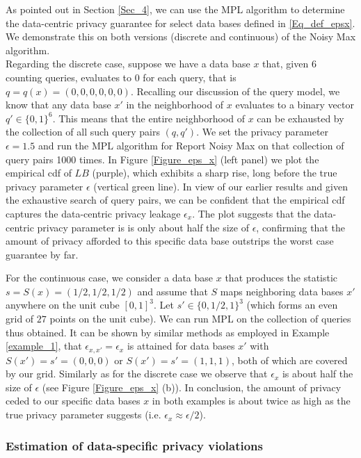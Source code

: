 \documentclass[conference]{IEEEtran}
\begin{document}
As pointed out in  Section \ref{Sec_4}, we can use the MPL algorithm to determine the data-centric privacy guarantee for select data bases defined in \eqref{Eq_def_epsx}.  We demonstrate this on both versions (discrete and continuous) of the Noisy Max algorithm. \\
Regarding the discrete case, suppose we have a data base $x$ that, given $6$ counting queries, evaluates to $0$ for each query, that is $q = q(x) = (0,0,0,0,0,0)$. Recalling our discussion of the query model, we know that any data base $x'$ in the neighborhood of $x$ evaluates to a binary vector $q' \in \{ 0,1 \}^6$. This means that the entire neighborhood of $x$ can be exhausted by the collection of all such query pairs $(q,q')$. We set the privacy parameter $\epsilon = 1.5$ and run the MPL algorithm for Report Noisy Max on that collection of query pairs 1000 times. In Figure \ref{Figure_eps_x} (left panel) we plot the empirical cdf of $LB$ (purple), which exhibits a sharp rise, long before the true privacy parameter $\epsilon$ (vertical green line).
In view of our earlier results and given the exhaustive search of query pairs, we can be confident that the empirical cdf captures the data-centric privacy leakage $\epsilon_x$.
The plot suggests that the data-centric privacy parameter is is only about half the size of $\epsilon$, confirming that the amount of privacy afforded to this specific data base outstrips the worst case guarantee by far.


For the continuous case, we consider a data base $x$ that produces the statistic $s = S(x) =(1/2, 1/2, 1/2)$ and assume that $S$ maps neighboring data bases $x'$ anywhere on the unit cube $[0,1]^3$. Let $s' \in \{0, 1/2, 1\}^3$ (which forms an even grid of $27$ points on the unit cube). We can run MPL on the collection of queries thus obtained. It can be shown by similar methods as employed in Example \ref{example_1}, that $\epsilon_{x,x'} = \epsilon_x$  is attained for data bases $x'$ with $S(x')=s'=(0,0,0)$ or  $S(x')=s'=(1,1,1)$, both of which are covered by our grid. Similarly as for the discrete case we observe that $\epsilon_x$ is about half the size of $\epsilon$ (see Figure \ref{Figure_eps_x} (b)). In conclusion, the amount of privacy ceded to our specific data bases $x$ in both examples is about twice as high as the true privacy parameter suggests (i.e. $\epsilon_x \approx \epsilon/2$). 



\subsubsection*{\textbf{Estimation of data-specific privacy violations}} 
\end{document}

